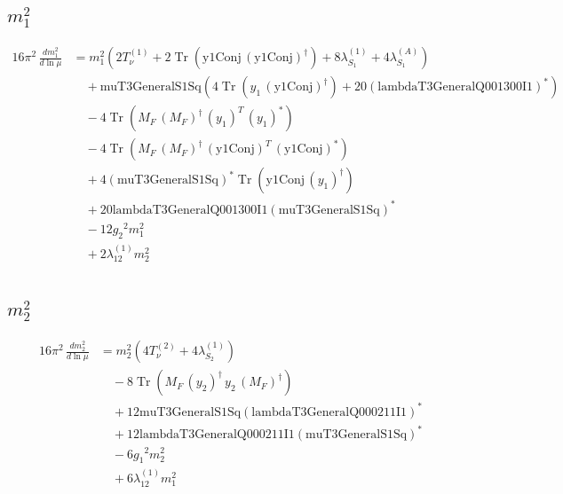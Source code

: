 \documentclass[10pt,a4paper]{article}
\begin{document}
\subsection*{$m_1^2$}
\begin{align*}
16\pi^2\,\frac{d m_1^2}{d\ln\mu} &={m_1^2} (2 T_{\nu}^{(1)}+2 \operatorname{Tr}\!\left(\text{y1Conj}\,\left(\text{y1Conj}\right)^{\dagger}\right)+8 {\lambda_{S_1}^{(1)}}+4 {\lambda_{S_1}^{(A)}}) \\
&\quad +\text{muT3GeneralS1Sq} (4 \operatorname{Tr}\!\left({y_1}\,\left(\text{y1Conj}\right)^{\dagger}\right)+20 \left(\text{lambdaT3GeneralQ001300I1}\right)^{*}) \\
&\quad -4 \operatorname{Tr}\!\left({M_F}\,\left({M_F}\right)^{\dagger}\,\left({y_1}\right)^{T}\,\left({y_1}\right)^{*}\right) \\
&\quad -4 \operatorname{Tr}\!\left({M_F}\,\left({M_F}\right)^{\dagger}\,\left(\text{y1Conj}\right)^{T}\,\left(\text{y1Conj}\right)^{*}\right) \\
&\quad +4 \left(\text{muT3GeneralS1Sq}\right)^{*} \operatorname{Tr}\!\left(\text{y1Conj}\,\left({y_1}\right)^{\dagger}\right) \\
&\quad +20 \text{lambdaT3GeneralQ001300I1} \left(\text{muT3GeneralS1Sq}\right)^{*} \\
&\quad -12 {g_2}^2 {m_1^2} \\
&\quad +2 {\lambda_{12}^{(1)}} {m_2^2} \\
\end{align*}
\subsection*{$m_2^2$}
\begin{align*}
16\pi^2\,\frac{d m_2^2}{d\ln\mu} &={m_2^2} (4 T_{\nu}^{(2)}+4 {\lambda_{S_2}^{(1)}}) \\
&\quad -8 \operatorname{Tr}\!\left({M_F}\,\left({y_2}\right)^{\dagger}\,{y_2}\,\left({M_F}\right)^{\dagger}\right) \\
&\quad +12 \text{muT3GeneralS1Sq} \left(\text{lambdaT3GeneralQ000211I1}\right)^{*} \\
&\quad +12 \text{lambdaT3GeneralQ000211I1} \left(\text{muT3GeneralS1Sq}\right)^{*} \\
&\quad -6 {g_1}^2 {m_2^2} \\
&\quad +6 {\lambda_{12}^{(1)}} {m_1^2} \\
\end{align*}
\end{document}
